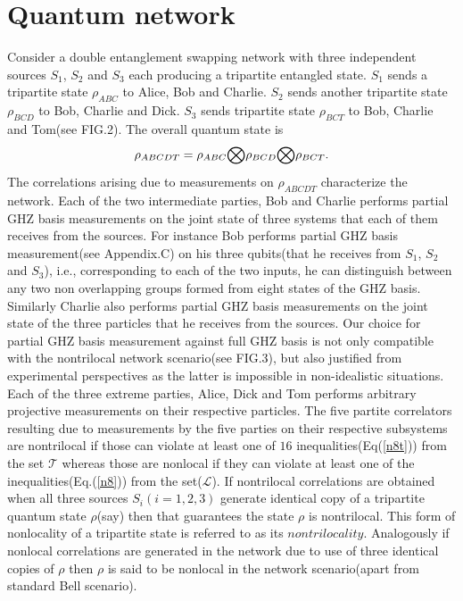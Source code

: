 \documentclass[pra,10pt,twocolumn,superscriptaddress,floatfix,showpacs]{revtex4-1}
\begin{document}
\section{Quantum network}\label{qu}
Consider a double entanglement swapping network with three independent sources $S_1$, $S_2$ and $S_3$ each producing a tripartite entangled state. $S_1$ sends a tripartite state $\rho_{ABC}$ to Alice, Bob and Charlie. $S_2$ sends another tripartite state $\rho_{BCD}$ to Bob, Charlie and Dick. $S_3$ sends tripartite state $\rho_{BCT}$ to Bob, Charlie and Tom(see FIG.2). The overall quantum state is
\begin{equation}\label{n13}
\rho_{ABCDT}=\rho_{ABC}\small{\bigotimes}\rho_{BCD}\small{\bigotimes}\rho_{BCT}.
\end{equation}
The correlations arising due to measurements on $\rho_{ABCDT}$ characterize the network.
Each of the two intermediate parties, Bob and Charlie performs partial GHZ basis measurements on the joint state of three systems that each of them receives from the sources. For instance Bob performs partial GHZ basis measurement(see Appendix.C) on his three qubits(that he receives from $S_1$, $S_2$ and $S_3$), i.e., corresponding to each of the two inputs, he can distinguish between any two non overlapping groups formed from eight states of the GHZ basis. Similarly Charlie also performs partial GHZ basis measurements on the joint state of the three particles that he receives from the sources. Our choice for partial GHZ basis measurement against full GHZ basis is not only compatible with the nontrilocal network scenario(see FIG.3), but also justified from experimental perspectives as the latter is impossible in non-idealistic situations. Each of the three extreme parties, Alice, Dick and Tom  performs arbitrary projective measurements on their respective particles. The five partite correlators resulting due to measurements by the five parties on their respective subsystems are nontrilocal if those can violate at least one of $16$ inequalities(Eq(\ref{n8t})) from the set $\mathcal{T}$ whereas those are nonlocal if they can violate at least one of the inequalities(Eq.(\ref{n8})) from the set($\mathcal{L}$). If nontrilocal correlations are obtained when all three sources  $S_i(i=1,2,3)$ generate identical copy of a tripartite quantum state $\rho$(say) then that guarantees the state $\rho$ is nontrilocal. This form of nonlocality of a tripartite state is referred to as its $\textit{nontrilocality}$. Analogously if nonlocal correlations are generated in the network due to use of three  identical copies of $\rho$ then $\rho$ is said to be nonlocal in the network scenario(apart from standard Bell scenario).\\
\end{document}
